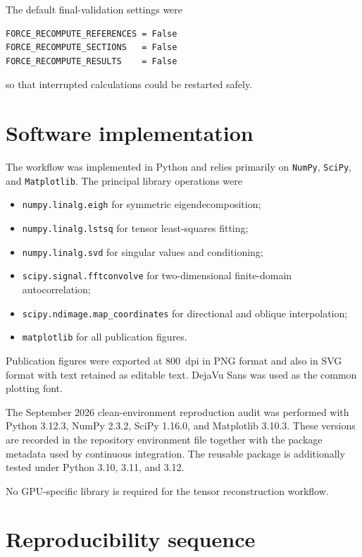 \documentclass{article}
\begin{document}
The default final-validation settings were

\begin{verbatim}
FORCE_RECOMPUTE_REFERENCES = False
FORCE_RECOMPUTE_SECTIONS   = False
FORCE_RECOMPUTE_RESULTS    = False
\end{verbatim}

so that interrupted calculations could be restarted safely.

\section{Software implementation}
\label{sec:SI_software}

The workflow was implemented in Python and relies primarily on
\texttt{NumPy}, \texttt{SciPy}, and \texttt{Matplotlib}. The principal
library operations were

\begin{itemize}
    \item \texttt{numpy.linalg.eigh} for symmetric eigendecomposition;
    \item \texttt{numpy.linalg.lstsq} for tensor least-squares fitting;
    \item \texttt{numpy.linalg.svd} for singular values and conditioning;
    \item \texttt{scipy.signal.fftconvolve} for two-dimensional
          finite-domain autocorrelation;
    \item \texttt{scipy.ndimage.map\_coordinates} for directional and
          oblique interpolation;
    \item \texttt{matplotlib} for all publication figures.
\end{itemize}

Publication figures were exported at 800~dpi in PNG format and also in
SVG format with text retained as editable text. DejaVu Sans was used as
the common plotting font.

The September 2026 clean-environment reproduction audit was performed
with Python 3.12.3, NumPy 2.3.2, SciPy 1.16.0, and Matplotlib 3.10.3.
These versions are recorded in the repository environment file together
with the package metadata used by continuous integration. The reusable
package is additionally tested under Python 3.10, 3.11, and 3.12.

No GPU-specific library is required for the tensor reconstruction
workflow.

\section{Reproducibility sequence}
\label{sec:SI_sequence}
\end{document}
